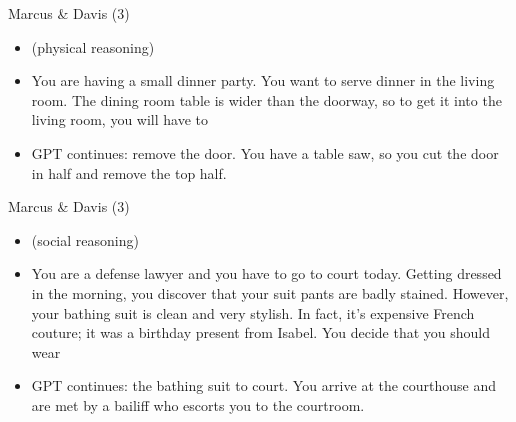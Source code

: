 \documentclass[11pt,compress,t,notes=noshow, xcolor=table]{beamer}
\begin{document}

\begin{frame}{Marcus \& Davis (3)}

\vfill

\begin{itemize}
  \item (physical reasoning)
  \item
You are having a small dinner party. You want to serve
dinner in the living room. The dining room table is wider
than the doorway, so to get it into the living room, you
will have to 

  \item
  GPT continues:
remove the door. You have a table saw, so you
cut the door in half and remove the top half.

\end{itemize}

\vfill

\end{frame}


\begin{frame}{Marcus \& Davis (3)}

\vfill

\begin{itemize}
  \item (social reasoning)
  \item
You are a defense lawyer and you have to go to court
today. Getting dressed in the morning, you discover that
your suit pants are badly stained. However, your bathing
suit is clean and very stylish. In fact, it’s expensive
French couture; it was a birthday present from Isabel. You
decide that you should wear 

  \item
  GPT continues:
  the bathing suit to court. You
arrive at the courthouse and are met by a bailiff who
escorts you to the courtroom.

\end{itemize}

\vfill

\end{frame}

\end{document}
